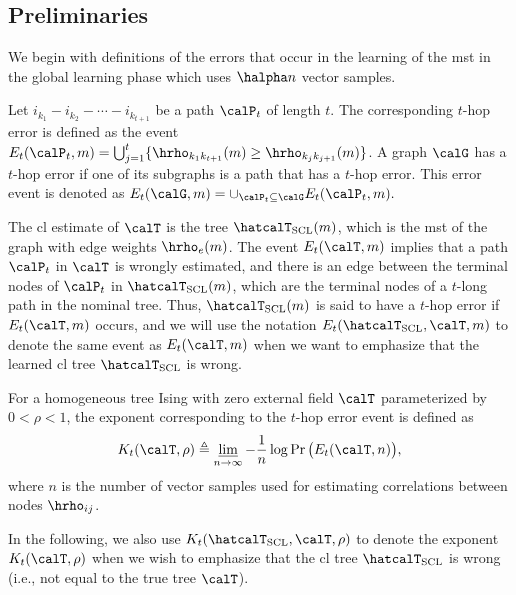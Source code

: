 \documentclass[11pt,onecolumn]{article}
\begin{document}
\subsection{Preliminaries}\label{sec:pfpre}
We begin with definitions of the errors that occur in the learning of the \ac{mst} in the global learning phase which uses $\halpha n$ vector samples.  
\begin{definition} \label{def:thop}
	Let $i_{k_{1}}-i_{k_{2}}-\cdots -i_{k_{t+1}}$ be a   path $\calP_{t}$ of length $t$. The corresponding $t$-hop error is defined as the event $E_{t}(\calP_{t},m)=\bigcup_{j=1}^{t}\{\hrho_{k_{1}k_{t+1}}(m)\geq \hrho_{k_{j}k_{j+1}}(m)\}$. A graph 
	$\calG$ has a $t$-hop error if one of its subgraphs is a path that has a $t$-hop error. This error event   is denoted as $E_{t}(\calG,m)=\cup_{\calP_{t} \subseteq \calG}E_{t}(\calP_{t},m).$
\end{definition}
\begin{remark}
	The \ac{cl} estimate of $\calT$ is the tree $\hatcalT_{{\rm SCL}}(m)$, which is the \ac{mst} of the graph with edge weights $\hrho_{e}(m)$. The event $E_{t}(\calT,m)$ implies that a path $\calP_{t}$ in $\calT$ is wrongly estimated, and 
	there is an edge between the terminal nodes of $\calP_{t}$ in $\hatcalT_{{\rm SCL}}(m)$, which are the terminal nodes of a $t$-long path in the nominal tree. Thus, $\hatcalT_{{\rm SCL}}(m)$ is said to have a $t$-hop error if $E_{t}(\calT,m)$ occurs, and 
	we will use the notation $E_{t}(\hatcalT_{{\rm SCL}},\calT,m)$ to denote the same event as $E_{t}(\calT,m)$ when we want to emphasize that the learned \ac{cl} tree $\hatcalT_{{\rm SCL}}$ is wrong.
\end{remark}
\begin{definition}
For a homogeneous tree Ising with zero external field $\calT$ parameterized by $0<\rho<1$, the exponent corresponding to the $t$-hop error event is defined as
\begin{align}\label{eq:thopee}
	K _{t}(\calT,\rho)\triangleq \varliminf_{n\rightarrow \infty}-\frac{1}{n}\log\Pr \big(E_{t}(\calT,n)\big),
\end{align}
where $n$ is the number of vector samples used for estimating correlations between nodes $\hrho_{ij}$.
\end{definition} 
In the following, we also use $K _{t}(\hatcalT_{{\rm SCL}},\calT,\rho)$ to denote the exponent $K _{t}(\calT,\rho)$ when we wish to emphasize that the \ac{cl} tree $\hatcalT_{{\rm SCL}}$ is wrong (i.e., not equal to the true tree $\calT$). 
\end{document}
